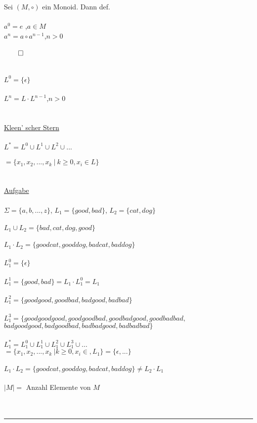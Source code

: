 \documentclass[18pt,a4paper]{scrreprt}
\newcommand{\tab}{\hspace*{2em}}
\begin{document}
Sei $(M, \circ)$ ein Monoid. Dann def.\\
\\
$a^0 = e$\tab\tab\:\:\:  ,$a \in M$\\
$a^n = a \circ a^{n-1}$\tab ,$n > 0$\\
\\
$\qed$\\
\\
\\
$L^0 = \{\epsilon\}$\\
\\
$L^n = L \cdot L^{n-1}$\tab ,$n>0$\\
\\
\\
\uline{Kleen' scher Stern}\\
\\
$L^* = L^0 \cup L^1 \cup L^2 \cup ...$\\
\\
\tab $= \{x_1, x_2, ..., x_k \:\vert\: k \geqslant 0, x_i \in L\}$\\
\\
\\
\uline{Aufgabe}\\
\\
$\Sigma = \{a,b,...,z\}$, $L_1 = \{good, bad\}$, $L_2 = \{cat, dog\}$\\
\\
$L_1 \cup L_2 = \{bad, cat, dog, good\}$\\
\\
$L_1 \cdot L_2 = \{goodcat, gooddog, badcat, baddog\}$\\
\\
$L_1^0 = \{\epsilon\}$\\
\\
$L_1^1 = \{good, bad\} = L_1 \cdot L_1^0 = L_1$\\
\\
$L_1^2  = \{goodgood, goodbad, badgood, badbad\}$\\
\\
$L_1^3 = \{ goodgoodgood, goodgoodbad, goodbadgood, goodbadbad,$\\
\tab\:\:\: $badgoodgood, badgoodbad, badbadgood, badbadbad\}$\\
\\
$L_1^* = L_1^0 \cup L_1^1 \cup L_1^2 \cup L_1^3 \cup ...$\\
\tab $= \{x_1, x_2, ..., x_k \:\vert k \geqslant 0, x_i \in, L_1\} = \{\epsilon, ...\}$\\
\\
$L_1 \cdot L_2 = \{goodcat, gooddog, badcat, baddog\} \neq L_2 \cdot L_1$\\
\\
$\vert M \vert =$ Anzahl Elemente von $M$\\ 
\\
\\
\rule{\textwidth}{0.4mm}\\
\end{document}
